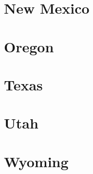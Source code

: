 \chapter{New Mexico}


\chapter{Oregon}


\chapter{Texas}


\chapter{Utah}


\chapter{Wyoming}


 

